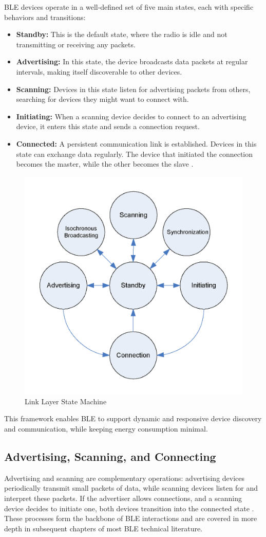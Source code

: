 BLE devices operate in a well-defined set of five main states, each with specific behaviors and transitions:
\begin{itemize}
    \item \textbf{Standby:} This is the default state, where the radio is idle and not transmitting or receiving any packets.
    \item \textbf{Advertising:} In this state, the device broadcasts data packets at regular intervals, making itself discoverable to other devices.
    \item \textbf{Scanning:} Devices in this state listen for advertising packets from others, searching for devices they might want to connect with.
    \item \textbf{Initiating:} When a scanning device decides to connect to an advertising device, it enters this state and sends a connection request.
    \item \textbf{Connected:} A persistent communication link is established. Devices in this state can exchange data regularly. The device that initiated the connection becomes the master, while the other becomes the slave \cite{introtoble}.
\end{itemize}
\begin{figure}[H]
    \centering
    \includegraphics[width=0.45\linewidth]{linklayerstates.png}
    \caption{Link Layer State Machine}
    \label{fig:linklayerstates}
\end{figure}
This framework enables BLE to support dynamic and responsive device discovery and communication, while keeping energy consumption minimal.
\subsection{Advertising, Scanning, and Connecting}

Advertising and scanning are complementary operations: advertising devices periodically transmit small packets of data, while scanning devices listen for and interpret these packets. If the advertiser allows connections, and a scanning device decides to initiate one, both devices transition into the connected state \cite{introtoble}. These processes form the backbone of BLE interactions and are covered in more depth in subsequent chapters of most BLE technical literature.


